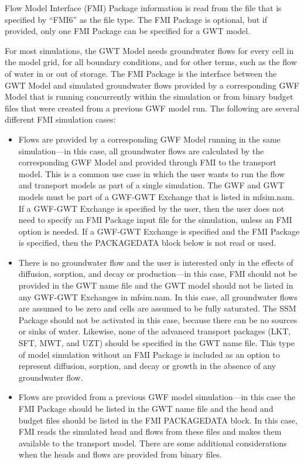 Flow Model Interface (FMI) Package information is read from the file that is specified by ``FMI6'' as the file type.  The FMI Package is optional, but if provided, only one FMI Package can be specified for a GWT model.

For most simulations, the GWT Model needs groundwater flows for every cell in the model grid, for all boundary conditions, and for other terms, such as the flow of water in or out of storage.  The FMI Package is the interface between the GWT Model and simulated groundwater flows provided by a corresponding GWF Model that is running concurrently within the simulation or from binary budget files that were created from a previous GWF model run.  The following are several different FMI simulation cases:

\begin{itemize}

\item Flows are provided by a corresponding GWF Model running in the same simulation---in this case, all groundwater flows are calculated by the corresponding GWF Model and provided through FMI to the transport model.  This is a common use case in which the user wants to run the flow and transport models as part of a single simulation.  The GWF and GWT models must be part of a GWF-GWT Exchange that is listed in mfsim.nam.  If a GWF-GWT Exchange is specified by the user, then the user does not need to specify an FMI Package input file for the simulation, unless an FMI option is needed.  If a GWF-GWT Exchange is specified and the FMI Package is specified, then the PACKAGEDATA block below is not read or used.

\item There is no groundwater flow and the user is interested only in the effects of diffusion, sorption, and decay or production---in this case, FMI should not be provided in the GWT name file and the GWT model should not be listed in any GWF-GWT Exchanges in mfsim.nam.  In this case, all groundwater flows are assumed to be zero and cells are assumed to be fully saturated.  The SSM Package should not be activated in this case, because there can be no sources or sinks of water.  Likewise, none of the advanced transport packages (LKT, SFT, MWT, and UZT) should be specified in the GWT name file.  This type of model simulation without an FMI Package is included as an option to represent diffusion, sorption, and decay or growth in the absence of any groundwater flow.

\item Flows are provided from a previous GWF model simulation---in this case the FMI Package should be listed in the GWT name file and the head and budget files should be listed in the FMI PACKAGEDATA block.  In this case, FMI reads the simulated head and flows from these files and makes them available to the transport model.  There are some additional considerations when the heads and flows are provided from binary files.


\end{itemize}

